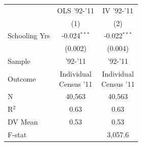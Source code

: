 
\begin{tabular}[t]{lcc}
\toprule
  & OLS '92-'11 & IV '92-'11\\
  & (1) & (2)\\
\midrule
Schooling Yrs & -0.024$^{***}$ & -0.022$^{***}$\\
 & (0.002) & (0.004)\\
\midrule
Sample & '92-'11 & '92-'11  \\
Outcome & \makecell{Individual\\Census '11} & \makecell{Individual\\Census '11}  \\
\midrule
N & 40,563 & 40,563\\
R$^2$ & 0.63 & 0.63\\
DV Mean & 0.53 & 0.53\\
F-stat &  & 3,057.6\\
\bottomrule
\end{tabular}
